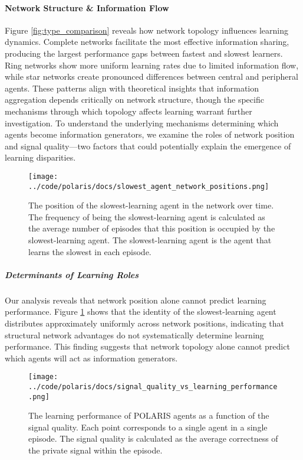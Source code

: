 \paragraph{Network Structure \& Information Flow} Figure \ref{fig:type_comparison} reveals how network topology influences learning dynamics. Complete networks facilitate the most effective information sharing, producing the largest performance gaps between fastest and slowest learners. Ring networks show more uniform learning rates due to limited information flow, while star networks create pronounced differences between central and peripheral agents. These patterns align with theoretical insights that information aggregation depends critically on network structure, though the specific mechanisms through which topology affects learning warrant further investigation.
\iffalse
To understand the underlying mechanisms determining which agents become information generators, we examine the roles of network position and signal quality—two factors that could potentially explain the emergence of learning disparities.

\begin{figure}[!htbp]
    \centering
    \texttt{[image: ../code/polaris/docs/slowest\_agent\_network\_positions.png]}
    \caption{The position of the slowest-learning agent in the network over time. The frequency of being the slowest-learning agent is calculated as the average number of episodes that this position is occupied by the slowest-learning agent. The slowest-learning agent is the agent that learns the slowest in each episode.}
    \label{fig:slowest_agent_network_positions}
\end{figure}

\subparagraph{Determinants of Learning Roles} Our analysis reveals that network position alone cannot predict learning performance. Figure \ref{fig:slowest_agent_network_positions} shows that the identity of the slowest-learning agent distributes approximately uniformly across network positions, indicating that structural network advantages do not systematically determine learning performance. This finding suggests that network topology alone cannot predict which agents will act as information generators.

\begin{figure}[!htbp]
    \centering
    \texttt{[image: ../code/polaris/docs/signal\_quality\_vs\_learning\_performance.png]}
    \caption{The learning performance of POLARIS agents as a function of the signal quality. Each point corresponds to a single agent in a single episode. The signal quality is calculated as the average correctness of the private signal within the episode.}
    \label{fig:signal_quality_vs_learning_performance}
\end{figure}

